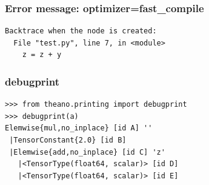 \documentclass[utf8x,xcolor=pdftex,dvipsnames,table]{beamer}
\begin{document}
\begin{frame}[fragile]
  \frametitle{Error message: optimizer=fast\_compile}

\begin{lstlisting}
Backtrace when the node is created:
  File "test.py", line 7, in <module>
    z = z + y

\end{lstlisting}
\end{frame}


\begin{frame}[fragile]
  \frametitle{debugprint}

\begin{lstlisting}
>>> from theano.printing import debugprint
>>> debugprint(a)
Elemwise{mul,no_inplace} [id A] ''
 |TensorConstant{2.0} [id B]
 |Elemwise{add,no_inplace} [id C] 'z'
   |<TensorType(float64, scalar)> [id D]
   |<TensorType(float64, scalar)> [id E]
\end{lstlisting}
\end{frame}



\end{document}
